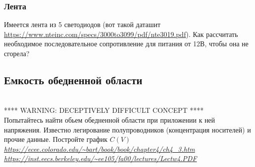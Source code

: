 \documentclass[a4paper,12pt]{article} %
\begin{document}
  \subsubsection{Лента}
  Имеется лента из 5 светодиодов (вот такой даташит \url{https://www.nteinc.com/specs/3000to3099/pdf/nte3019.pdf}). Как рассчитать необходимое последовательное сопротивление для питания от 12В, чтобы она не сгорела?

  \subsection{Емкость обедненной области}\\
  **** WARNING:  DECEPTIVELY DIFFICULT CONCEPT ****\\

  Попытайтесь найти обьем обедненной области при приложении к ней напряжения. Известно легирование полупроводников (концентрация носителей) и прочие данные. Постройте график $C(V)$\\
  \textit{ \url{https://ecee.colorado.edu/~bart/book/book/chapter4/ch4_3.htm}}\\
  \textit{ \url{https://inst.eecs.berkeley.edu/~ee105/fa00/lectures/Lectw4.PDF}}



\end{document}
